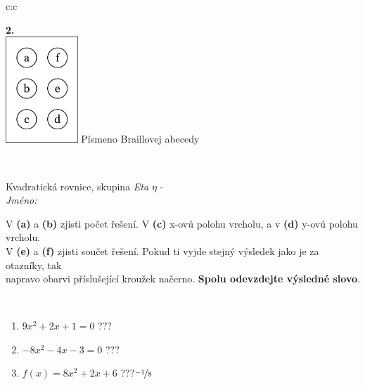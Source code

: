 \documentclass[10pt]{report}
\begin{document}
\begin{tabular}{c:c}
\begin{minipage}[c][104.5mm][t]{0.5\linewidth}
\begin{center}
\begin{minipage}{0.20\linewidth}
\begin{center}
{\Huge\bfseries 2.} \\[2mm]
\includegraphics[height=40mm]{../images/braille.png}
{\small Písmeno Braillovej abecedy}
\end{center}
\end{minipage}
\end{center}
\end{minipage}
\\ \hdashline
\begin{minipage}[c][104.5mm][t]{0.5\linewidth}
\begin{center}
\vspace{7mm}
{\huge Kvadratická rovnice, skupina \textit{Eta $\eta$} -}\\[5mm]
\textit{Jméno:}\phantom{xxxxxxxxxxxxxxxxxxxxxxxxxxxxxxxxxxxxxxxxxxxxxxxxxxxxxxxxxxxxxxxxx}\\[5mm]
\begin{minipage}{0.95\linewidth}
\begin{center}
V \textbf{(a)} a \textbf{(b)} zjisti počet řešení. V \textbf{(c)} x-ovú polohu vrcholu, a v \textbf{(d)} y-ovú polohu vrcholu.\\V \textbf{(e)} a \textbf{(f)} zjisti součet řešení. Pokud ti vyjde stejný výsledek jako je za otazníky, tak\\napravo obarvi příslušející kroužek načerno. \textbf{Spolu odevzdejte výsledné slovo}.
\end{center}
\end{minipage}
\\[1mm]
\begin{minipage}{0.79\linewidth}
\begin{center}
\begin{varwidth}{\linewidth}
\begin{enumerate}
\Large
\item $9x^2+2x+1=0$\quad \dotfill\; ???\;\dotfill {}
\item $-8x^2-4x-3=0$\quad \dotfill\; ???\;\dotfill {}
\item $f(x)=8x^2+2x+6$\quad \dotfill\; ???\;\dotfill \quad $\nicefrac{-1}{8}$

\end{enumerate}
\end{varwidth}
\end{center}
\end{minipage}
\end{center}
\end{minipage}
\end{tabular}
\end{document}
